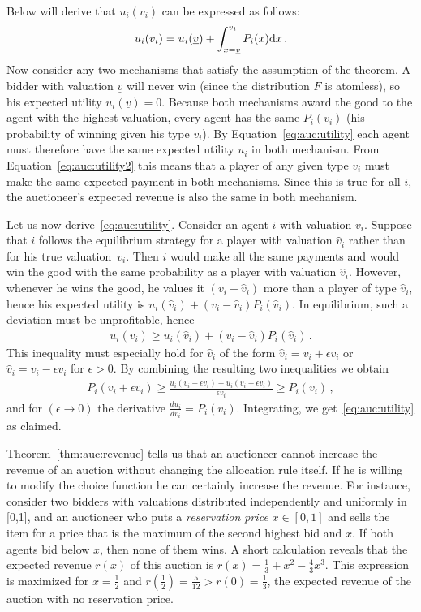 \noindent Below will derive that $u_i(v_i)$ can be expressed as follows:
\begin{align}
u_i(v_i) = u_i(\underline{v}) + \int_{x=\underline{v}}^{v_i} P_i(x) {\rm d}x\,. \label{eq:auc:utility}
\end{align}
Now consider any two mechanisms that satisfy the assumption of the theorem. A bidder with valuation $\underline{v}$ will never win (since the distribution $F$ is atomless), so his expected utility $u_i(\underline{v})=0$. Because both mechanisms award the good to the agent with the highest valuation, every agent has the same $P_i(v_i)$ (his probability of winning given his type $v_i$). By Equation~\eqref{eq:auc:utility} each agent must therefore have the same expected utility $u_i$ in both mechanism. From Equation~\eqref{eq:auc:utility2} this means that a player of any given type $v_i$ must make the same expected payment in both mechanisms. Since this is true for all $i$, the auctioneer's expected revenue is also the same in both mechanism.

Let us now derive~\eqref{eq:auc:utility}. Consider an agent $i$ with valuation $v_i$. Suppose that $i$ follows the equilibrium strategy for a player with valuation $\hat{v}_i$ rather than for his true valuation~$v_i$. Then $i$ would make all the same payments and would win the good with the same probability as a player with valuation $\hat{v}_i$. However, whenever he wins the good, he values it $(v_i - \hat{v}_i)$ more than a player of type $\hat{v}_i$, hence his expected utility is $u_i(\hat{v}_i) + (v_i - \hat{v}_i)P_i(\hat{v}_i)$. In equilibrium, such a deviation must be unprofitable, hence
\begin{align*}
u_i(v_i) \geq u_i(\hat{v}_i) + (v_i - \hat{v}_i)P_i(\hat{v}_i)\,.
\end{align*}
This inequality must especially hold for $\hat{v}_i$ of the form $\hat{v}_i = v_i + \epsilon v_i$ or $\hat{v}_i = v_i - \epsilon v_i$ for $\epsilon > 0$. By combining the resulting two inequalities we obtain
\begin{align*}
P_i(v_i + \epsilon v_i) \geq \frac{u_i(v_i + \epsilon v_i) - u_i(v_i - \epsilon v_i)}{\epsilon v_i} \geq P_i (v_i)\,,
\end{align*}
and for $(\epsilon \to 0)$ the derivative $\frac{d u_i}{d v_i} = P_i(v_i)$. Integrating, we get~\eqref{eq:auc:utility} as claimed.

Theorem~\ref{thm:auc:revenue} tells us that an auctioneer cannot increase the revenue of an auction without changing the allocation rule itself. If he is willing to modify the choice function he can certainly increase the revenue. For instance, consider two bidders with valuations distributed independently and uniformly     in [0,1], and an auctioneer who puts a \emph{reservation price} $x \in [0,1]$ and sells the item for a price that is the maximum of the second highest bid and $x$. If both agents bid below $x$, then none of them wins. A short calculation reveals that the expected revenue $r(x)$ of this auction is $r(x)=\frac{1}{3} + x^2 - \frac{4}{3} x^3$. This expression is maximized for $x=\frac{1}{2}$ and $r(\frac{1}{2}) = \frac{5}{12} > r(0)=\frac{1}{3}$, the expected revenue of the auction with no reservation price.

